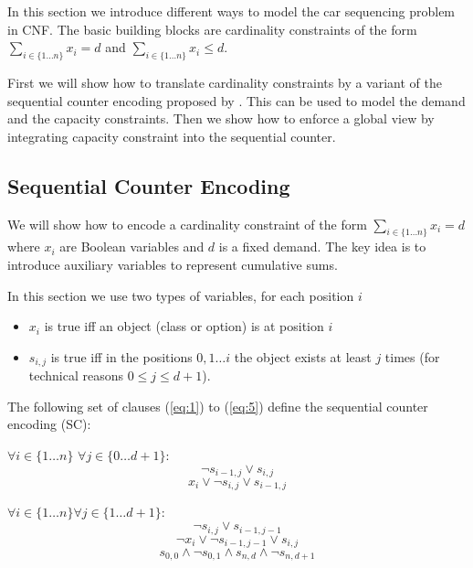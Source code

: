 \documentclass[]{llncs}
\begin{document}
In this section we introduce different ways to model the car sequencing problem in CNF. The basic building blocks are
cardinality constraints of the form $\sum_{i\in \{1\ldots n\}} x_{i} = d$ and $ \sum_{i\in \{1\ldots n\}} x_{i} \leq d
$.

First we will show how to translate cardinality constraints by a variant of the sequential counter encoding proposed by
\cite{Sinz05}. This can be used to model the demand and the capacity constraints. Then we show how to enforce a global
view by integrating capacity constraint into the sequential counter. 

\subsection{Sequential Counter Encoding}

We will show how to encode a cardinality constraint of the form $ \sum_{i\in \{1\ldots n\}} x_{i} = d $ where $x_i$ are
Boolean variables and $d$ is a fixed demand. The key idea is to introduce auxiliary variables to represent cumulative
sums.

In this section we use two types of variables, for each position $i$

\begin{itemize}
    \item  $x_i$ is true iff an object (class or option) is at position $i$
    \item  $s_{i,j}$ is true iff in the positions $0,1 \ldots i$ the object exists at least $j$ times (for technical
        reasons $0 \leq j \leq d+1$). 
\end{itemize} 

The following set of clauses (\ref{eq:1}) to (\ref{eq:5}) define the sequential counter encoding (SC):

$\forall i \in \{1\ldots n\}$ $\forall j \in\{0 \ldots d+1\}$: 
\begin{equation} \label{eq:1}
    \neg s_{i-1,j} \vee s_{i,j}
\end{equation}
\begin{equation} \label{eq:2}
    x_{i} \vee \neg s_{i,j} \vee s_{i-1,j}
\end{equation}

$\forall {i \in \{1\ldots n\}} \forall {j\in \{1\ldots d+1\}}$: 
\begin{equation} \label{eq:3}
    \neg s_{i,j} \vee s_{i-1,j-1}
\end{equation}
\begin{equation} \label{eq:4}
    \neg x_{i} \vee \neg s_{i-1,j-1} \vee s_{i,j}
\end{equation}
\begin{equation} \label{eq:5}
     s_{0,0} \wedge \neg s_{0,1} \wedge s_{n,d} \wedge \neg s_{n,d+1}
\end{equation}
\end{document}
